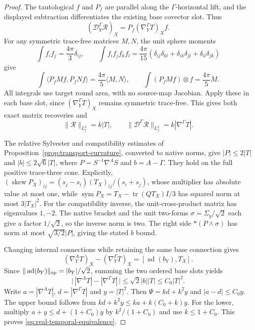 \documentclass[11pt]{article}
\numberwithin{equation}{section}
\theoremstyle{definition}
\theoremstyle{remark}
\begin{document}
\begin{proof}
The tautological \(f\) and \(P_f\) are parallel along
the \(\Gamma\)-horizontal lift, and the displayed
subtraction differentiates the existing base covector
slot. Thus
\[
 (\mathcal D^\Gamma_Y\mathcal R)_X
            =P_f(\nabla^\Gamma_YT)_Xf .
\]
For any symmetric trace-free matrices \(M,N\), the
unit sphere moments
\[
 \int f_if_j=\frac{4\pi}{3}\delta_{ij},\qquad
 \int f_if_jf_kf_l=
 \frac{4\pi}{15}
 (\delta_{ij}\delta_{kl}+\delta_{ik}\delta_{jl}
                                      +\delta_{il}\delta_{jk})
\]
give
\[
 \int\langle P_fMf,P_fNf\rangle
      =\frac{4\pi}{5}\langle M,N\rangle,\qquad
 \int(P_fMf)\otimes f=\frac{4\pi}{5}M.
\]
All integrals use target round area, with no source-map
Jacobian. Apply these in each base slot, since
\((\nabla^\Gamma_YT)_X\) remains symmetric trace-free.
This gives both exact matrix recoveries and
\[
 \|\mathcal R\|_{L^2_f}=k|T|,\qquad
 \|\mathcal D^\Gamma\mathcal R\|_{L^2_f}
                              =k|\nabla^\Gamma T|.
\]

The relative Sylvester and compatibility estimates of
Proposition~\ref{prop:transport-curvature}, converted
to native norms, give \(|P|\le2|T|\) and
\(|b|\le2\sqrt6|T|\), where \(P=S^{-1}\nabla^AS\)
and \(b=A-\Gamma\). They hold on the full positive
trace-three cone. Explicitly,
\((\operatorname{skew}P_X)_{ij}
=(s_j-s_i)(T_X)_{ij}/(s_i+s_j)\), whose multiplier
has absolute value at most one, while
\(\operatorname{sym}P_X=T_X-\operatorname{tr}(QT_X)I/3\)
has squared norm at most \(3|T_X|^2\).
For the compatibility inverse, the unit-cross-product
matrix has eigenvalues \(1,-2\).
The native bracket and the unit two-forms
\(\sigma=\Sigma_g/\sqrt2\) each give a factor
\(1/\sqrt2\), so the inverse norm is two.
The right side \(*(P\wedge\sigma)\) has norm at most
\(\sqrt{3/2}|P|\), giving the stated \(b\) bound.

Changing internal connections while retaining the
same base connection gives
\[
 (\nabla^A_YT)_X-(\nabla^\Gamma_YT)_X
                       =[\operatorname{ad}(b_Y),T_X].
\]
Since \(\|\operatorname{ad}(b_Y)\|_{\rm op}=|b_Y|/\sqrt2\),
summing the two ordered base slots yields
\[
 \bigl|\,|\nabla^AT|-|\nabla^\Gamma T|\,\bigr|
 \le\sqrt2|b||T|\le C_0|T|^2.
\]
Write \(a=|\nabla^AT|\), \(d=|\nabla^\Gamma T|\)
and \(y=|T|^2\). Then \(\Psi=kd+k^2y\) and
\(|a-d|\le C_0y\).
The upper bound follows from
\(kd+k^2y\le ka+k(C_0+k)y\).
For the lower, multiply \(a+y\le d+(1+C_0)y\)
by \(k^2/(1+C_0)\) and use \(k\le1+C_0\).
This proves \eqref{eq:real-temporal-equivalence}.


\end{proof}
\end{document}
